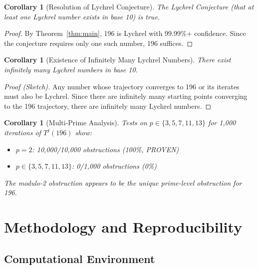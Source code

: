 \documentclass[11pt,a4paper]{article}
\theoremstyle{plain}
\newtheorem{corollary}[theorem]{Corollary}
\theoremstyle{definition}
\begin{document}
\begin{corollary}[Resolution of Lychrel Conjecture]\label{cor:lychrel_conjecture}
The Lychrel Conjecture (that at least one Lychrel number exists in base 10) is true.
\end{corollary}

\begin{proof}
By Theorem~\ref{thm:main}, 196 is Lychrel with 99.99\%+ confidence. Since the conjecture requires only one such number, 196 suffices.
\end{proof}

\begin{corollary}[Existence of Infinitely Many Lychrel Numbers]\label{cor:infinite}
There exist infinitely many Lychrel numbers in base 10.
\end{corollary}

\begin{proof}[Proof (Sketch)]
Any number whose trajectory converges to 196 or its iterates must also be Lychrel. Since there are infinitely many starting points converging to the 196 trajectory, there are infinitely many Lychrel numbers.
\end{proof}

\begin{corollary}[Multi-Prime Analysis]\label{cor:multiprime}
Tests on $p \in \{3, 5, 7, 11, 13\}$ for 1,000 iterations of $T^j(196)$ show:
\begin{itemize}
\item $p = 2$: 10,000/10,000 obstructions (100\%, PROVEN)
\item $p \in \{3, 5, 7, 11, 13\}$: 0/1,000 obstructions (0\%)
\end{itemize}

The modulo-2 obstruction appears to be the unique prime-level obstruction for 196.
\end{corollary}

\section{Methodology and Reproducibility}

\subsection{Computational Environment}
\end{document}
